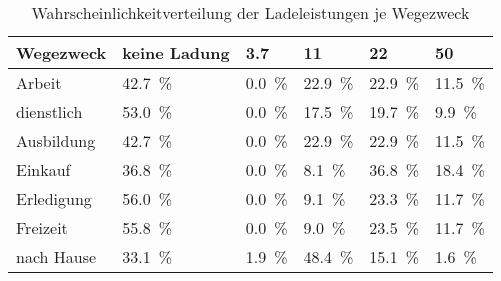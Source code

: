 {
\renewcommand{\arraystretch}{1.2}%
\begin{table}[H]
	\begin{center}
		\caption{Wahrscheinlichkeitverteilung der Ladeleistungen je Wegezweck}
		\begin{tabu} to \textwidth {X[1.2] X[1.2, r] X[1, r] X[1, r] X[1, r] X[1, r]}
			\hline
			Wegezweck  & keine Ladung        & \SI{3.7}{\kw}      & \SI{11}{\kw}        & \SI{22}{\kw}        & \SI{50}{\kw}        \\ \hline
			Arbeit     & \SI{42.7}{\percent} & \SI{0.0}{\percent} & \SI{22.9}{\percent} & \SI{22.9}{\percent} & \SI{11.5}{\percent} \\
			dienstlich & \SI{53.0}{\percent} & \SI{0.0}{\percent} & \SI{17.5}{\percent} & \SI{19.7}{\percent} & \SI{9.9}{\percent}  \\
			Ausbildung & \SI{42.7}{\percent} & \SI{0.0}{\percent} & \SI{22.9}{\percent} & \SI{22.9}{\percent} & \SI{11.5}{\percent} \\
			Einkauf    & \SI{36.8}{\percent} & \SI{0.0}{\percent} & \SI{8.1}{\percent}  & \SI{36.8}{\percent} & \SI{18.4}{\percent} \\
			Erledigung & \SI{56.0}{\percent} & \SI{0.0}{\percent} & \SI{9.1}{\percent}  & \SI{23.3}{\percent} & \SI{11.7}{\percent} \\
			Freizeit   & \SI{55.8}{\percent} & \SI{0.0}{\percent} & \SI{9.0}{\percent}  & \SI{23.5}{\percent} & \SI{11.7}{\percent} \\
			nach Hause & \SI{33.1}{\percent} & \SI{1.9}{\percent} & \SI{48.4}{\percent} & \SI{15.1}{\percent} & \SI{1.6}{\percent}  \\ \hline
		\end{tabu}
		\label{tab:WegezweckProbability2050}
	\end{center}
	\vspace{-3mm}%
\end{table}
}